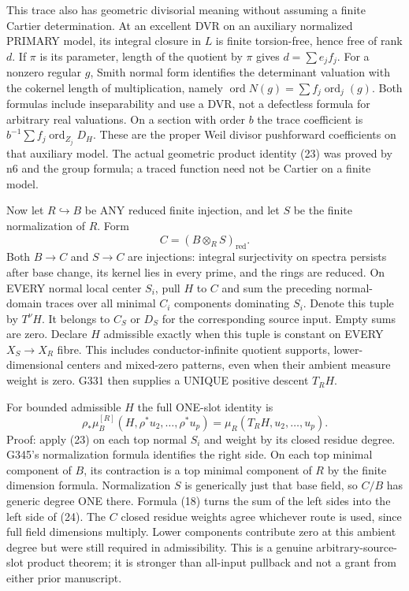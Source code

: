 \documentclass[11pt]{article}
\begin{document}
This trace also has geometric divisorial meaning without assuming a finite Cartier determination. At an excellent DVR on an auxiliary normalized PRIMARY model, its integral closure in $L$ is finite torsion-free, hence free of rank $d$. If $\pi$ is its parameter, length of the quotient by $\pi$ gives $d=\sum e_jf_j$. For a nonzero regular $g$, Smith normal form identifies the determinant valuation with the cokernel length of multiplication, namely $\operatorname{ord}N(g)=\sum f_j\operatorname{ord}_j(g)$. Both formulas include inseparability and use a DVR, not a defectless formula for arbitrary real valuations. On a section with order $b$ the trace coefficient is $b^{-1}\sum f_j\operatorname{ord}_{Z_j}D_H$. These are the proper Weil divisor pushforward coefficients on that auxiliary model. The actual geometric product identity (23) was proved by n6 and the group formula; a traced function need not be Cartier on a finite model.

Now let $R\hookrightarrow B$ be ANY reduced finite injection, and let $S$ be the finite normalization of $R$. Form
\[
C=(B\otimes_R S)_{\mathrm{red}}.
\]
Both $B\to C$ and $S\to C$ are injections: integral surjectivity on spectra persists after base change, its kernel lies in every prime, and the rings are reduced. On EVERY normal local center $S_i$, pull $H$ to $C$ and sum the preceding normal-domain traces over all minimal $C_i$ components dominating $S_i$. Denote this tuple by $T^\nu H$. It belongs to $C_S$ or $D_S$ for the corresponding source input. Empty sums are zero. Declare $H$ admissible exactly when this tuple is constant on EVERY $X_S\to X_R$ fibre. This includes conductor-infinite quotient supports, lower-dimensional centers and mixed-zero patterns, even when their ambient measure weight is zero. G331 then supplies a UNIQUE positive descent $T_RH$.

For bounded admissible $H$ the full ONE-slot identity is
\[
\rho_*\mu_B^{[R]}(H,\rho^*u_2,\ldots,\rho^*u_p)
=\mu_R(T_RH,u_2,\ldots,u_p).                          \tag{24}
\]
Proof: apply (23) on each top normal $S_i$ and weight by its closed residue degree. G345's normalization formula identifies the right side. On each top minimal component of $B$, its contraction is a top minimal component of $R$ by the finite dimension formula. Normalization $S$ is generically just that base field, so $C/B$ has generic degree ONE there. Formula (18) turns the sum of the left sides into the left side of (24). The $C$ closed residue weights agree whichever route is used, since full field dimensions multiply. Lower components contribute zero at this ambient degree but were still required in admissibility. This is a genuine arbitrary-source-slot product theorem; it is stronger than all-input pullback and not a grant from either prior manuscript.
\end{document}
